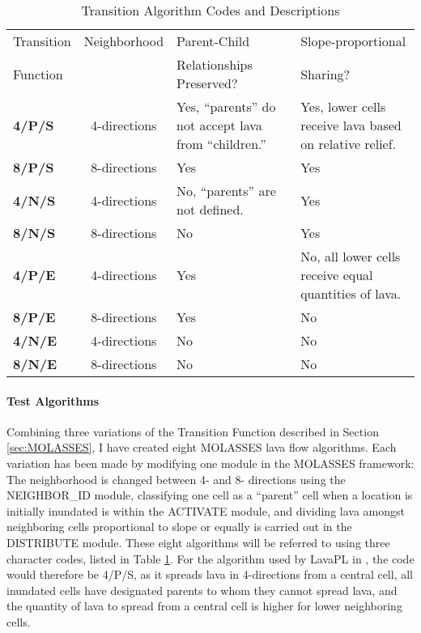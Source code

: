 	\begin{center}
		\begin{table}[h]
		\caption{Transition Algorithm Codes and Descriptions}
		\begin{tabular}{l c p{5cm} p{5cm}}
			\toprule
			Transition&Neighborhood&Parent-Child&Slope-proportional\\
			Function&&Relationships Preserved?&Sharing?\\
			\midrule
			\textbf{4/P/S} &4-directions & Yes, ``parents'' do not accept lava from ``children.'' & Yes, lower cells receive lava based on relative relief.\\
			\textbf{8/P/S} &8-directions & Yes & Yes\\
			\textbf{4/N/S} &4-directions & No, ``parents'' are not defined. & Yes\\
			\textbf{8/N/S} &8-directions & No  & Yes\\
			\textbf{4/P/E} &4-directions & Yes & No, all lower cells receive equal quantities of lava.\\
			\textbf{8/P/E} &8-directions & Yes & No\\
			\textbf{4/N/E} &4-directions & No  & No\\
			\textbf{8/N/E} &8-directions & No  & No\\
			
			\bottomrule
		\end{tabular}
		\label{tab_algorithmcodes}
		\end{table}
	\end{center}

\paragraph{Test Algorithms} Combining three variations of the Transition Function described in Section \ref{sec:MOLASSES}, I have created eight MOLASSES lava flow algorithms. Each variation has been made by modifying one module in the MOLASSES framework: The neighborhood is changed between 4- and 8- directions using the NEIGHBOR\_ID module, classifying one cell as a ``parent'' cell when a location is initially inundated is within the ACTIVATE module, and dividing lava amongst neighboring cells proportional to slope or equally is carried out in the DISTRIBUTE module. These eight algorithms will be referred to using three character codes, listed in Table \ref{tab_algorithmcodes}. For the algorithm used by LavaPL in \citet{connor2012probabilistic}, the code would therefore be 4/P/S, as it spreads lava in 4-directions from a central cell, all inundated cells have designated parents to whom they cannot spread lava, and the quantity of lava to spread from a central cell is higher for lower neighboring cells.

